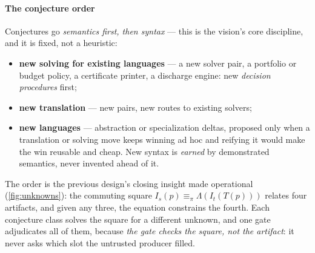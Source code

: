 \paragraph{The conjecture order}
Conjectures go \emph{semantics first, then syntax} --- this is the
vision's core discipline, and it is fixed, not a heuristic:
\begin{itemize}
\item[\textbf{(a)}] \textbf{new solving for existing languages} ---
  a new solver pair, a portfolio or budget policy, a certificate
  printer, a discharge engine: new \emph{decision procedures} first;
\item[\textbf{(b)}] \textbf{new translation} --- new pairs, new
  routes to existing solvers;
\item[\textbf{(c)}] \textbf{new languages} --- abstraction or
  specialization deltas, proposed only when a translation or solving
  move keeps winning ad hoc and reifying it would make the win
  reusable and cheap. New syntax is \emph{earned} by demonstrated
  semantics, never invented ahead of it.
\end{itemize}
The order is the previous design's closing insight made operational
(\cref{fig:unknowns}): the commuting square
$I_s(p) \equiv_\pi \Lambda(I_t(T(p)))$ relates four artifacts, and
given any three, the equation constrains the fourth. Each conjecture
class solves the square for a different unknown, and one gate
adjudicates all of them, because \emph{the gate checks the square,
not the artifact}: it never asks which slot the untrusted producer
filled.

